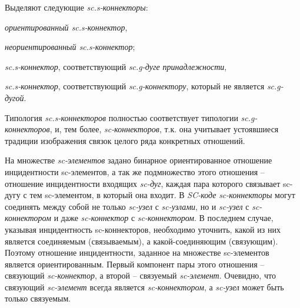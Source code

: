 \begin{SCn}
\end{SCn}

Выделяют следующие \textit{sc.s-коннекторы}:
\begin{textitemize}
	\item \textit{ориентированный \textit{sc.s-коннектор}},
	\item \textit{неориентированный \textit{sc.s-коннектор}};
	\item \textit{\textit{sc.s-коннектор}}, соответствующий \textit{sc.g-дуге принадлежности},
	\item \textit{\textit{sc.s-коннектор}}, соответствующий \textit{sc.g-коннектору}, который не является \textit{sc.g-дугой}.
\end{textitemize}

Типология \textit{sc.s-коннекторов} полностью соответствует типологии \textit{sc.g-коннекторов}, и, тем более, \textit{sc-коннекторов}, т.к. она учитывает устоявшиеся традиции изображения связок целого ряда конкретных отношений.

На множестве \textit{sc-элементов} задано бинарное ориентированное отношение инцидентности sc-элементов, а так же подмножество этого отношения -- отношение инцидентности входящих \textit{sc-дуг}, каждая пара которого связывает sc-дугу с тем sc-элементом, в который она входит. В \textit{SC-коде} \textit{sc-коннекторы} могут соединять между собой не только \textit{sc-узел} с \textit{sc-узлами}, но и \textit{sc-узел} с \textit{sc-коннектором} и даже \textit{sc-коннектор} с \textit{sc-коннектором}. В последнем случае, указывая инцидентность sc-коннекторов, необходимо уточнить, какой из них является соединяемым (связываемым), а какой-соединяющим (связующим). Поэтому отношение инцидентности, заданное на множестве sc-элементов является ориентированным. Первый компонент пары этого отношения – связующий \textit{sc-коннектор}, а второй -- связуемый \textit{sc-элемент}. Очевидно, что связующий \textit{sc-элемент} всегда является \textit{sc-коннектором}, а \textit{sc-узел} может быть только связуемым.

